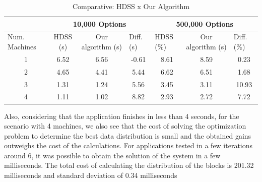 \documentclass[journal]{IEEEtran}
\begin{document}
\begin{table}[htb]
\centering
\caption{Comparative: HDSS x Our Algorithm}
\begin{tabular}{c|c|c|c|c|c|c|}
\cline{2-7}
\multicolumn{1}{l|}{}                 & \multicolumn{3}{c|}{10,000 Options}                              & \multicolumn{3}{c|}{500,000 Options}                                                  \\ \hline
\multicolumn{1}{|l|}{Num. Machines} & HDSS (s) & Our algorithm (s) & \multicolumn{1}{l|}{Diff. (s)} & \multicolumn{1}{l|}{HDSS (\%)} & Our algorithm (s) & \multicolumn{1}{l|}{Diff. (\%)} \\ \hline
\multicolumn{1}{|c|}{1 }       & 6.52     & 6.56              &    -0.61                       
			 & 8.61                          & 8.59              &   0.23                         \\ \hline
\multicolumn{1}{|c|}{2 }      & 4.65     & 4.41              &    5.44                         
				& 6.62                          & 6.51              & 1.68                            \\ \hline
\multicolumn{1}{|c|}{3 }      & 1.31     & 1.24              & 5.56                            
			& 3.45                          & 3.11              &         10.93                    \\ \hline
\multicolumn{1}{|c|}{4 }      & 1.11     & 1.02              & 8.82                       
			    & 2.93                          & 2.72              &         7.72                  \\ \hline
\end{tabular}
\label{table: black}
\end{table}

Also, considering that the application finishes in less than 4 seconds, for the
scenario with 4 machines, we also see that the cost of solving the optimization
problem to determine the best data distribution is small and the obtained gains
outweighs the cost of the calculations. For applications tested in a few
iterations around 6, it was possible to obtain the solution of the system in a
few milliseconds. The total cost of calculating the distribution of the blocks is 201.32 
milliseconds and standard deviation of 0.34 milliseconds
\end{document}
